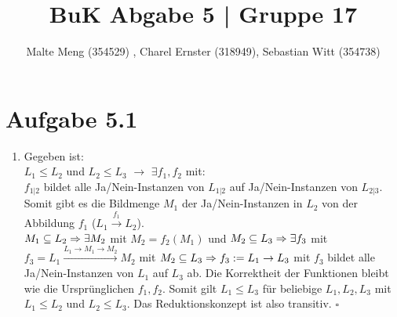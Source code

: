 \documentclass{article}
\title{BuK Abgabe 5 | Gruppe 17}
\author{Malte Meng (354529) , Charel Ernster (318949), Sebastian Witt (354738)}
\begin{document}
	\maketitle 
	\section[a 5.1]{Aufgabe 5.1}
		\begin{enumerate} [label=(\alph*).]
			\item Gegeben ist:\\
			$L_1 \leq L_2$ und $L_2 \leq L_3$
			$\rightarrow$
			$\exists f_1,f_2$ mit:\\
			$f_{1|2}$ bildet alle Ja/Nein-Instanzen von $L_{1|2}$ auf Ja/Nein-Instanzen von $L_{2|3}$.\\
			Somit gibt es die Bildmenge $M_1$ der Ja/Nein-Instanzen in $L_2$ von der Abbildung $f_1$ ($L_1 \xrightarrow{f_1} L_2$).\\
			$M_1 \subseteq L_2 \Rightarrow\\ \exists M_2$ mit $M_2 = f_2(M_1)$ und $M_2 \subseteq L_3 \Rightarrow\\
			\exists f_3$ mit $f_3 = L_1 \xrightarrow{L_1 \rightarrow M_1 \rightarrow M_2} M_2$ mit $ M_2 \subseteq L_3 \Rightarrow\\
			f_3 := L_1 \rightarrow L_3$ mit $f_3$ bildet alle Ja/Nein-Instanzen von $L_1$ auf $L_3$ ab. Die Korrektheit der Funktionen bleibt wie die Ursprünglichen $f_1,f_2$. Somit gilt $L_1 \leq L_3$ für beliebige $L_1,L_2,L_3$ mit $L_1 \leq L_2$ und $L_2 \leq L_3$. Das Reduktionskonzept ist also transitiv.  $\square$
		\end{enumerate}
\end{document}
